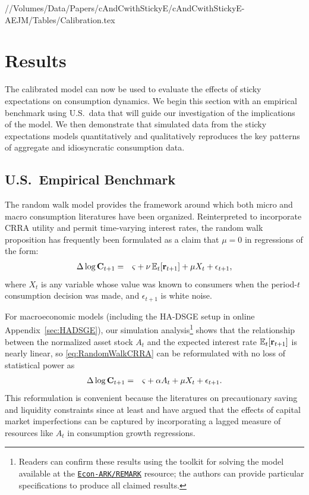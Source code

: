 \documentclass[titlepage]{./econtex}
\begin{document}
//Volumes/Data/Papers/cAndCwithStickyE/cAndCwithStickyE-AEJM/Tables/Calibration.tex


\section{Results}\label{sec:Results}

The calibrated model can now be used to evaluate the effects of sticky expectations on consumption dynamics.  We begin this section with an empirical benchmark using U.S.\ data that will guide our investigation of the implications of the model.  We then demonstrate that simulated data from the sticky expectations models quantitatively and qualitatively reproduces the key patterns of aggregate and idiosyncratic consumption data.

\subsection{U.S.\ Empirical Benchmark}
\label{sec:EmpBenchmark}

The random walk model provides the framework around which both micro and macro consumption literatures have been organized.  Reinterpreted to incorporate CRRA utility and permit time-varying interest rates, the random walk proposition has frequently been formulated as a claim that $\mu=0$ in regressions of the form:
\begin{eqnarray}
  \label{eq:RandomWalkCRRA}
  \Delta \log \mathbf{C}_{t+1} & = & \varsigma+\nu \operatorname{\mathbb{E}}_{t}[\mathbf{r}_{t+1}]+\mu X_{t}+\epsilon_{t+1},
\end{eqnarray}
where $X_{t}$ is any variable whose value was known to consumers
when the period-$t$ consumption decision was made, and $\epsilon_{t+1}$
is white noise.

For macroeconomic models (including the HA-DSGE setup in online Appendix~\ref{sec:HADSGE}), our simulation analysis\footnote{Readers can confirm these results using the toolkit for solving the model available at the \href{https://github.com/econ-ark/REMARK/tree/master/REMARKs/cAndCwithStickyE}{\texttt{Econ-ARK/REMARK}} resource; the authors can provide particular specifications to produce all claimed results.}
shows that the relationship between the normalized asset stock $A_{t}$ and the expected interest rate $\operatorname{\mathbb{E}}_{t}[\mathbf{r}_{t+1}]$ is nearly linear, so \eqref{eq:RandomWalkCRRA} can be reformulated with no loss of statistical power as
\begin{eqnarray*}
  \label{eq:RandomWalkAForm}
  \Delta \log \mathbf{C}_{t+1} & = & \varsigma+\alpha A_{t}+\mu X_{t}+\epsilon_{t+1}.
\end{eqnarray*}
This reformulation is convenient because the literatures on precautionary saving and liquidity constraints since at least \cite{zeldes:jpe} and \citeyear{zeldesStochastic} have argued that the effects of capital market imperfections can be captured by incorporating a lagged measure of resources like $A_{t}$ in consumption growth regressions.
\end{document}
